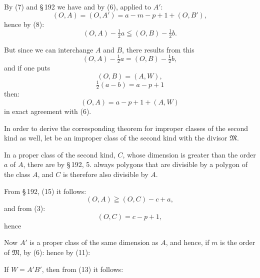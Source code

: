 By (7) and \S\,192 we have
and by (6), applied to $A'$:
\[
(O, A) = (O, A') = a - m - p + 1 + (O, B'),
\]
hence by (8):
\[
(O, A) - \tfrac{1}{2} a \leqq (O, B) - \tfrac{1}{2} b.
\]

But since we can interchange $A$ and $B$, there results from
this
\[
(O, A) - \tfrac{1}{2} a = (O, B) - \tfrac{1}{2} b,
\]
and if one puts
\[
(O, B) = (A, W),
\]
\[
\tfrac{1}{2}(a - b) = a - p + 1
\]
then:
\[
(O, A) = a - p + 1 + (A, W)
\]
in exact agreement with (6).

In order to derive the corresponding theorem for improper
classes of the second kind as well, let
be an improper class of the second kind with the divisor $\mathfrak{M}$.

In a proper class of the second kind, $C$, whose
dimension is greater than the order $a$ of $A$, there are by
\S\,192, 5. always polygons that are divisible by a polygon of the class $A$,
and $C$ is therefore also divisible by $A$.

From \S\,192, (15) it follows:
\[
(O, A) \geqq (O, C) - c + a,
\]
and from (3):
\[
(O, C) = c - p + 1,
\]
hence

Now $A'$ is a proper class of the same dimension
as $A$, and hence, if $m$ is the order of $\mathfrak{M}$, by (6):
hence by (11):


If $W = A'B'$, then from (13) it follows:
